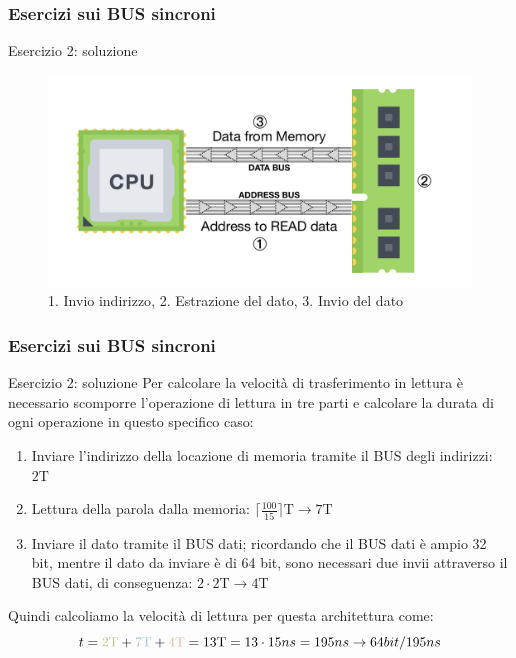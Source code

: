 \begin{frame}
	\frametitle{Esercizi sui BUS sincroni}
	
	\begin{block}{Esercizio 2: soluzione}
		\begin{figure}[!htbp]
			\centering
			\includegraphics[width=0.86\linewidth]{images/6_bus/bus_synch.pdf}
			\caption{{\color{CpuGreen}1. Invio indirizzo}, {\color{CpuBlue}2. Estrazione del dato}, {\color{CpuRed}3. Invio del dato}}
		\end{figure}
	\end{block}
\end{frame}


\begin{frame}
	\frametitle{Esercizi sui BUS sincroni}
	
	\begin{block}{Esercizio 2: soluzione}
		Per calcolare la velocità di trasferimento in lettura è necessario scomporre l'operazione di lettura in tre parti e calcolare la durata di ogni operazione in questo specifico caso:
		\begin{enumerate}
			\item {\color{CpuGreen}Inviare l'indirizzo della locazione di memoria tramite il BUS degli indirizzi: $2\mathrm{T}$}
			\item {\color{CpuBlue}Lettura della parola dalla memoria: $\Big\lceil \frac{100}{15} \Big\rceil \mathrm{T} \rightarrow 7\mathrm{T}$}
			\item {\color{CpuRed} Inviare il dato tramite il BUS dati; ricordando che il BUS dati è ampio 32 bit, mentre il dato da inviare è di 64 bit, sono necessari due invii attraverso il BUS dati, di conseguenza: $2 \cdot 2\mathrm{T} \rightarrow 4\mathrm{T}$}
		\end{enumerate}
		Quindi calcoliamo la velocità di lettura per questa architettura come:
		$$t = {\color{CpuGreen}2\mathrm{T}} + {\color{CpuBlue}7\mathrm{T}} + {\color{CpuRed}4\mathrm{T}} = 13\mathrm{T} = 13 \cdot 15ns = 195ns \rightarrow 64bit/195ns$$
	\end{block}
\end{frame}



